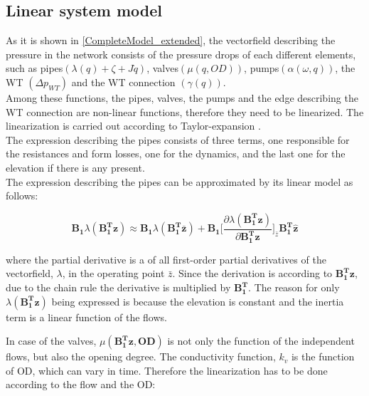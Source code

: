 %
%
%
%

\subsection{Linear system model}
 \label{SystemLin}
 
As it is shown in \eqref{CompleteModel_extended}, the vectorfield describing the pressure in the network consists of the pressure drops of each different elements, such as pipes$(\lambda(q) + \zeta + J \dot{q})$, valves$(\mu(q,OD))$, pumps$(\alpha(\omega, q))$, the WT $(\Delta p_{WT})$ and the WT connection $(\gamma(q))$.
\\
Among these functions, the pipes, valves, the pumps and the edge describing the WT connection are non-linear functions, therefore they need to be linearized. The linearization is carried out according to Taylor-expansion \todo{[source]}.
\\
The expression describing the pipes consists of three terms, one responsible for the resistances and form losses, one for the dynamics, and the last one for the elevation if there is any present. 
\\
The expression describing the pipes can be approximated by its linear model as follows:

\begin{equation}
  \pmb{B_1} \lambda(\pmb{{B_1^{T}}}\pmb{z}) \approx  \pmb{B_1} \lambda(\pmb{B_1^T \bar{ z}}) + \pmb{B_1} \bigg[ \frac{\partial{\lambda(\pmb{{B_1^{T}}}\pmb{z})}}{{\partial{\pmb{{B_1^{T}}}\pmb{z}}}}   \bigg]_{\bar{z}} \pmb{{B_1^{T}}}\pmb{\hat{z}}
\label{lambda_lin}
\end{equation}

where the partial derivative is a of all first-order partial derivatives of the vectorfield, $\lambda$, in the operating point $\bar{z}$. Since the derivation is according to $\pmb{{B_1^{T}}}\pmb{z}$, due to the chain rule the derivative is multiplied by $\pmb{{B_1^{T}}}$. The reason for only $\lambda(\pmb{{B_1^{T}}}\pmb{z})$ being expressed is because the elevation is constant and the inertia term is a linear function of the flows.


In case of the valves, $\mu(\pmb{{B_1^{T}}}\pmb{z}, \pmb{OD})$ is not only the function of the independent flows, but also the opening degree. The conductivity function, $k_v$ is the function of OD, which can vary in time. Therefore the linearization has to be done according to the flow and the OD: 

